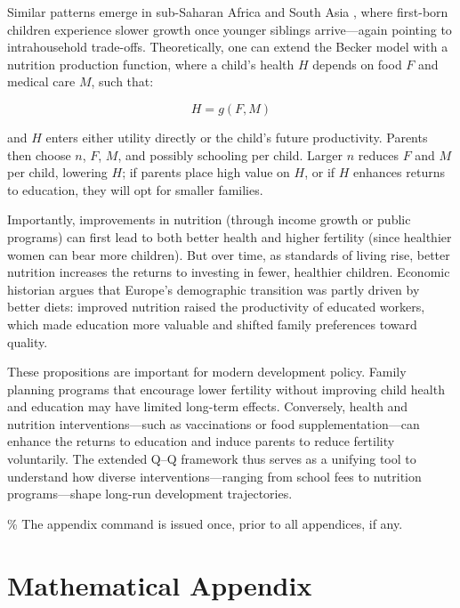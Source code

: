 \documentclass[]{AEA}
\begin{document}
Similar patterns emerge in sub-Saharan Africa
\citep{bishwakarma2019first} and South Asia , where first-born children
experience slower growth once younger siblings arrive---again pointing
to intrahousehold trade-offs. Theoretically, one can extend the Becker
model with a nutrition production function, where a child's health \(H\)
depends on food \(F\) and medical care \(M\), such that:

\[
H = g(F, M)
\]

and \(H\) enters either utility directly or the child's future
productivity. Parents then choose \(n\), \(F\), \(M\), and possibly
schooling per child. Larger \(n\) reduces \(F\) and \(M\) per child,
lowering \(H\); if parents place high value on \(H\), or if \(H\)
enhances returns to education, they will opt for smaller families.

Importantly, improvements in nutrition (through income growth or public
programs) can first lead to both better health and higher fertility
(since healthier women can bear more children). But over time, as
standards of living rise, better nutrition increases the returns to
investing in fewer, healthier children. Economic historian
\citet{fogel1994economic} argues that Europe's demographic transition
was partly driven by better diets: improved nutrition raised the
productivity of educated workers, which made education more valuable and
shifted family preferences toward quality.

These propositions are important for modern development policy. Family
planning programs that encourage lower fertility without improving child
health and education may have limited long-term effects. Conversely,
health and nutrition interventions---such as vaccinations or food
supplementation---can enhance the returns to education and induce
parents to reduce fertility voluntarily. The extended Q--Q framework
thus serves as a unifying tool to understand how diverse
interventions---ranging from school fees to nutrition programs---shape
long-run development trajectories.




\% The appendix command is issued once, prior to all appendices, if any.
\appendix

\section{Mathematical Appendix}
\end{document}
